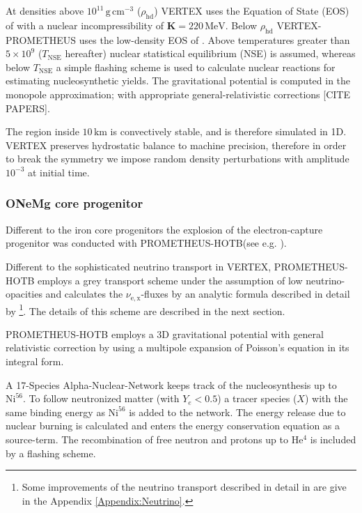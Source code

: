\documentclass[fleqn,usenatbib]{mnras}
\newcommand{\helium}{$\mathrm{He^{4}}$\xspace}
\newcommand{\gcc}{\text{g}\, \text{cm}^{-3}}
\newcommand{\prom}{\textsc{P{\footnotesize ROMETHEUS}-H{\footnotesize OT}B}\xspace}
\newcommand{\vertexprom}{\textsc{V{\footnotesize ERTEX}-P{\footnotesize ROMETHEUS}}\xspace}
\newcommand{\vertex}{\textsc{V{\footnotesize ERTEX}}\xspace}
\newcommand{\COM}[1]{{\color{red}#1}}
\begin{document}
At densities above $10^{11}\,\gcc$ ($\rho_{\text{hd}}$) \vertex uses  the Equation of State (EOS) of \cite{Lattimer1991} with a nuclear incompressibility of $\mathbf{K}=220\, \text{MeV}$. Below $\rho_{\text{hd}}$ \vertexprom uses the low-density EOS of \cite{Janka1999}. Above  temperatures greater than $5\times10^{9}$ ($T_{\text{NSE}}$ hereafter) nuclear statistical equilibrium (NSE) is assumed, whereas below $T_{\text{NSE}}$ a simple flashing scheme is used to calculate nuclear reactions for estimating nucleosynthetic yields. The gravitational potential is computed in the monopole approximation; with appropriate general-relativistic corrections \COM{[CITE PAPERS]}.

The region inside $10\,\text{km}$ is  convectively stable, and is therefore simulated in 1D. \vertex preserves hydrostatic balance to machine precision, therefore in order to break the symmetry we impose random density perturbations with amplitude $10^{-3}$ at initial time. 
\subsubsection{ONeMg core progenitor}
Different to the iron core progenitors the explosion of the electron-capture progenitor was conducted with \prom (see e.g. \citet{Wongwathanarat2012,Wongwathanarat2013}).

Different to the sophisticated neutrino transport in \vertex, \prom employs a grey transport scheme under the assumption of low neutrino-opacities and calculates the $\nu_{\mathrm{e,x}}$-fluxes by an analytic formula described in detail by \cite{Scheck2006}\footnote{Some improvements of the neutrino transport described in detail in \cite{Scheck2006} are give in the Appendix \ref{Appendix:Neutrino}.}. The details of this scheme are described in the next section.

\prom employs a 3D gravitational potential with general relativistic correction by using a multipole expansion of Poisson's equation in its integral form. 

A 17-Species Alpha-Nuclear-Network keeps track of the nucleosynthesis up to $\mathrm{Ni}^{56}$. To follow neutronized matter (with $Y_e < 0.5 $) a tracer species ($X$) with the same binding energy as $\mathrm{Ni}^{56}$ is added to the network. The energy release due to nuclear burning is calculated and enters the energy conservation equation as a source-term. 
The recombination of free neutron and protons up to \helium is included by a flashing scheme.
\end{document}
